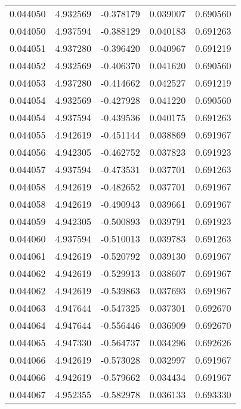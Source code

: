 \begin{tabular}{lrrrr}
0.044050    &  4.932569 & -0.378179 &  0.039007 &             0.690560 \\
0.044050    &  4.937594 & -0.388129 &  0.040183 &             0.691263 \\
0.044051    &  4.937280 & -0.396420 &  0.040967 &             0.691219 \\
0.044052    &  4.932569 & -0.406370 &  0.041620 &             0.690560 \\
0.044053    &  4.937280 & -0.414662 &  0.042527 &             0.691219 \\
0.044054    &  4.932569 & -0.427928 &  0.041220 &             0.690560 \\
0.044054    &  4.937594 & -0.439536 &  0.040175 &             0.691263 \\
0.044055    &  4.942619 & -0.451144 &  0.038869 &             0.691967 \\
0.044056    &  4.942305 & -0.462752 &  0.037823 &             0.691923 \\
0.044057    &  4.937594 & -0.473531 &  0.037701 &             0.691263 \\
0.044058    &  4.942619 & -0.482652 &  0.037701 &             0.691967 \\
0.044058    &  4.942619 & -0.490943 &  0.039661 &             0.691967 \\
0.044059    &  4.942305 & -0.500893 &  0.039791 &             0.691923 \\
0.044060    &  4.937594 & -0.510013 &  0.039783 &             0.691263 \\
0.044061    &  4.942619 & -0.520792 &  0.039130 &             0.691967 \\
0.044062    &  4.942619 & -0.529913 &  0.038607 &             0.691967 \\
0.044062    &  4.942619 & -0.539863 &  0.037693 &             0.691967 \\
0.044063    &  4.947644 & -0.547325 &  0.037301 &             0.692670 \\
0.044064    &  4.947644 & -0.556446 &  0.036909 &             0.692670 \\
0.044065    &  4.947330 & -0.564737 &  0.034296 &             0.692626 \\
0.044066    &  4.942619 & -0.573028 &  0.032997 &             0.691967 \\
0.044066    &  4.942619 & -0.579662 &  0.034434 &             0.691967 \\
0.044067    &  4.952355 & -0.582978 &  0.036133 &             0.693330 \\

\end{tabular}
